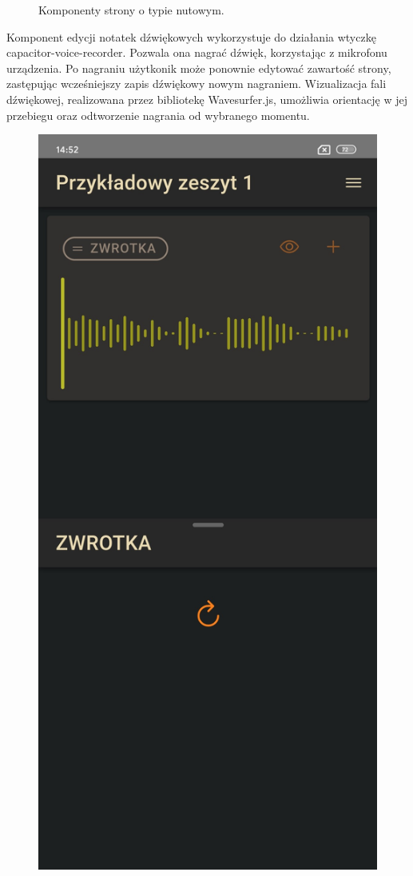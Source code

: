 \begin{figure}[H]
\begin{center}
	\end{center}
	\caption{Komponenty strony o typie nutowym.}
	\label{rys:score-page}
\end{figure}

Komponent edycji notatek dźwiękowych wykorzystuje do działania wtyczkę capacitor-voice-recorder. Pozwala ona nagrać
dźwięk, korzystając z mikrofonu urządzenia. Po nagraniu użytkonik może ponownie edytować zawartość strony, zastępując
wcześniejszy zapis dźwiękowy nowym nagraniem. Wizualizacja fali dźwiękowej, realizowana przez bibliotekę Wavesurfer.js,
umożliwia orientację w jej przebiegu oraz odtworzenie nagrania od wybranego momentu.
\begin{figure}[H]
	\begin{center}
		\includegraphics[scale=0.2]{media/AudioPage.jpg}

\end{center}
\end{figure}
